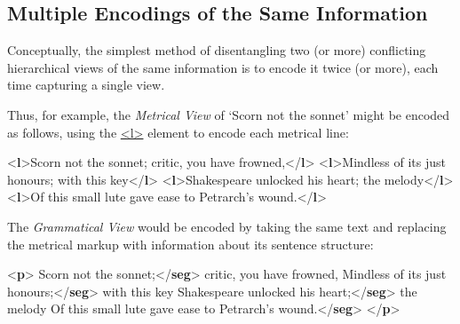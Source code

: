 \subsection[{Multiple Encodings of the Same Information}]{Multiple Encodings of the Same Information}\label{NHME}\par
Conceptually, the simplest method of disentangling two (or more) conflicting hierarchical views of the same information is to encode it twice (or more), each time capturing a single view.\par
Thus, for example, the \textit{Metrical View} of ‘Scorn not the sonnet’ might be encoded as follows, using the \hyperref[TEI.l]{<l>} element to encode each metrical line: \par\bgroup{}\exampleFont \begin{shaded}\noindent\mbox{}{<\textbf{l}>}Scorn not the sonnet; critic, you have frowned,{</\textbf{l}>}\mbox{}\newline 
{<\textbf{l}>}Mindless of its just honours; with this key{</\textbf{l}>}\mbox{}\newline 
{<\textbf{l}>}Shakespeare unlocked his heart; the melody{</\textbf{l}>}\mbox{}\newline 
{<\textbf{l}>}Of this small lute gave ease to Petrarch's wound.{</\textbf{l}>}\end{shaded}\egroup\par \par
The \textit{Grammatical View} would be encoded by taking the same text and replacing the metrical markup with information about its sentence structure: \par\bgroup{}\exampleFont \begin{shaded}\noindent\mbox{}{<\textbf{p}>}\mbox{}\newline 
{}Scorn not the sonnet;{</\textbf{seg}>}\mbox{}\newline 
{}critic, you have frowned, Mindless of its just honours;{</\textbf{seg}>}\mbox{}\newline 
{}with this key Shakespeare unlocked his heart;{</\textbf{seg}>}\mbox{}\newline 
{}the melody Of this small lute gave ease to Petrarch's wound.{</\textbf{seg}>}\mbox{}\newline 
{</\textbf{p}>}\end{shaded}\egroup\par \par
